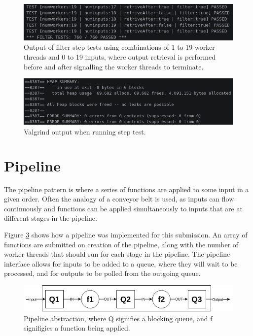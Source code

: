 \documentclass[12pt]{article}
\begin{document}
\begin{figure}[!ht]
	\centering 
	\includegraphics[width=\linewidth]{images/steptest}
	\caption{Output of filter step tests using combinations of 1 to 19 worker threads and 0 to 19 inputs, where output retrieval is performed before and after signalling the worker threads to terminate.}
	\label{fig:steptest}
\end{figure}

\begin{figure}[!ht]
	\centering 
	\includegraphics[width=\linewidth]{images/stepgrind}
	\caption{Valgrind output when running step test.}
	\label{fig:stepgrind}
\end{figure}

\section{Pipeline} 

The pipeline pattern is where a series of functions are applied to some input in a given order. Often the analogy of a conveyor belt is used, as inputs can flow continuously and functions can be applied simultaneously to inputs that are at different stages in the pipeline.

Figure \ref{fig:pipe} shows how a pipeline was implemented for this submission. An array of functions are submitted on creation of the pipeline, along with the number of worker threads that should run for each stage in the pipeline. The pipeline interface allows for inputs to be added to a queue, where they will wait to be processed, and for outputs to be polled from the outgoing queue. 

\begin{figure}[!ht]
	\centering 
	\includegraphics[width=\linewidth]{images/pipe}
	\caption{Pipeline abstraction, where Q signifies a blocking queue, and f signifigies a function being applied.}
	\label{fig:pipe}
\end{figure}
\end{document}

